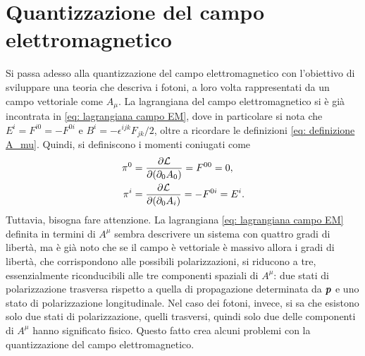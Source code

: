 \section[Quantizzazione del campo elettromagnetico]{Quantizzazione del campo \\ elettromagnetico}
Si passa adesso alla quantizzazione del campo elettromagnetico con l'obiettivo di sviluppare una teoria che descriva i fotoni, a loro volta rappresentati da un campo vettoriale come $A_\mu$. La lagrangiana del campo elettromagnetico si è già incontrata in \eqref{eq: lagrangiana campo EM}, dove in particolare si nota che $E^i = F^{i0} = -F^{0i}$ e $B^i = -\epsilon^{ijk}F_{jk}/2$, oltre a ricordare le definizioni \eqref{eq: definizione A_mu}. Quindi, si definiscono i momenti coniugati come
\begin{align}
    \pi^0 &= \frac{\partial\mathcal{L}}{\partial(\partial_0 A_0)} = F^{00} = 0, \\
    \pi^i &= \frac{\partial\mathcal{L}}{\partial(\partial_0 A_i)} = -F^{0i} = E^i.
\end{align}
Tuttavia, bisogna fare attenzione. La lagrangiana \eqref{eq: lagrangiana campo EM} definita in termini di $A^\mu$ sembra descrivere un sistema con quattro gradi di libertà, ma è già noto che se il campo è vettoriale è massivo allora i gradi di libertà, che corrispondono alle possibili polarizzazioni, si riducono a tre, essenzialmente riconducibili alle tre componenti spaziali di $A^\mu$: due stati di polarizzazione trasversa rispetto a quella di propagazione determinata da $\bm{p}$ e uno stato di polarizzazione longitudinale. Nel caso dei fotoni, invece, si sa che esistono solo due stati di polarizzazione, quelli trasversi, quindi solo due delle componenti di $A^\mu$ hanno significato fisico. Questo fatto crea alcuni problemi con la quantizzazione del campo elettromagnetico. 

